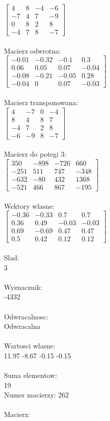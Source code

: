 \documentclass[a4paper,12pt]{article}
\begin{document}
$\begin{bmatrix} 4&8&-4&-6\\-7&4&7&-9\\0&8&2&8\\-4&7&8&-7 \end{bmatrix}$
\\
\\
Macierz odwrotna:\\

$\begin{bmatrix} -0.01&-0.32&-0.1&0.3\\0.06&0.05&0.07&-0.04\\-0.08&-0.21&-0.05&0.28\\-0.04&0&0.07&-0.03 \end{bmatrix}$
\\
\\
Macierz transponowana:\\

$\begin{bmatrix} 4&-7&0&-4\\8&4&8&7\\-4&7&2&8\\-6&-9&8&-7 \end{bmatrix}$
\\
\\
Macierz do potegi 3:\\

$\begin{bmatrix} 350&-898&-726&660\\-251&511&747&-348\\-632&-80&432&1368\\-521&466&867&-195 \end{bmatrix}$
\\
\\
Wektory wlasne:\\

$\begin{bmatrix} -0.36&-0.33&0.7&0.7\\0.36&0.49&-0.03&-0.03\\0.69&-0.69&0.47&0.47\\0.5&0.42&0.12&0.12 \end{bmatrix}$
\\
\\
Slad:\\
3
\\
\\
Wyznacznik:\\
-4332
\\
\\
Odwracalnosc:\\
Odwracalna
\\
\\
Wartosci wlasne:\\
11.97 -8.67 -0.15 -0.15
\\
\\
Suma elementow:\\
19
\\
\newpage
Numer macierzy:
262
\\
\\
Macierz:\\
\end{document}
